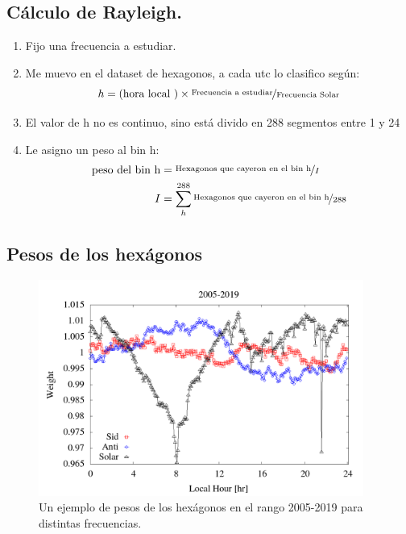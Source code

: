  


\subsection{Cálculo de Rayleigh.}


 \begin{enumerate}
   \item Fijo una frecuencia a estudiar.
   \item Me muevo en el dataset de hexagonos, a cada utc lo clasifico según:
   \begin{equation*}
     h = (\text{hora local })\times \nicefrac{\text{Frecuencia a estudiar}}{\text{Frecuencia Solar}}
   \end{equation*}
     \item El valor de h no es continuo, sino está divido en 288 segmentos entre 1 y 24
  \item Le asigno un peso al bin h:
   \begin{align*}
     \text{peso del bin h} &= \nicefrac{\text{Hexagonos que cayeron en el bin h}}{I}\\
     I &= \sum^{288}_h \nicefrac{\text{Hexagonos que cayeron en el bin h}}{288}
    \end{align*} 

 \end{enumerate}

 



\subsection{Pesos de los hexágonos}


\begin{figure}[htbp]
  \centering
  \includegraphics[width=0.95\textwidth]{../report_2_27_04_2020/Graficos/weigth2005-2019.png}
  \caption{Un ejemplo de pesos de los hexágonos en el rango 2005-2019 para distintas frecuencias.}
\end{figure}

